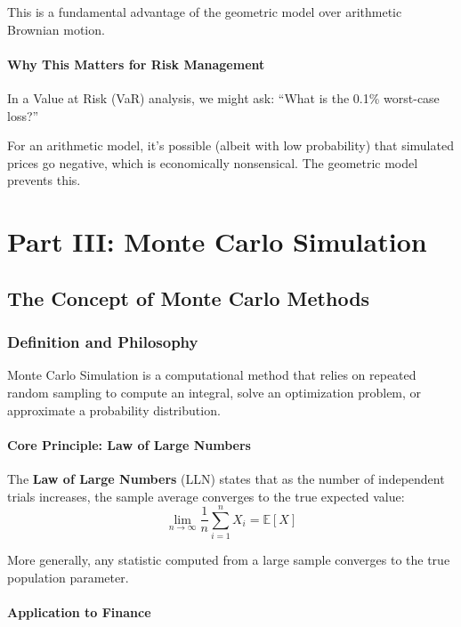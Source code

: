 \documentclass[12pt,a4paper]{article}
\begin{document}
This is a fundamental advantage of the geometric model over arithmetic Brownian motion.

\paragraph{Why This Matters for Risk Management}

In a Value at Risk (VaR) analysis, we might ask: ``What is the 0.1\% worst-case loss?'' 

For an arithmetic model, it's possible (albeit with low probability) that simulated prices go negative, which is economically nonsensical. The geometric model prevents this.

\newpage

\section{Part III: Monte Carlo Simulation}

\subsection{The Concept of Monte Carlo Methods}

\subsubsection{Definition and Philosophy}

Monte Carlo Simulation is a computational method that relies on repeated random sampling to compute an integral, solve an optimization problem, or approximate a probability distribution.

\paragraph{Core Principle: Law of Large Numbers}

The \textbf{Law of Large Numbers} (LLN) states that as the number of independent trials increases, the sample average converges to the true expected value:
\begin{equation}
\lim_{n \to \infty} \frac{1}{n} \sum_{i=1}^{n} X_i = \mathbb{E}[X]
\end{equation}

More generally, any statistic computed from a large sample converges to the true population parameter.

\paragraph{Application to Finance}
\end{document}
